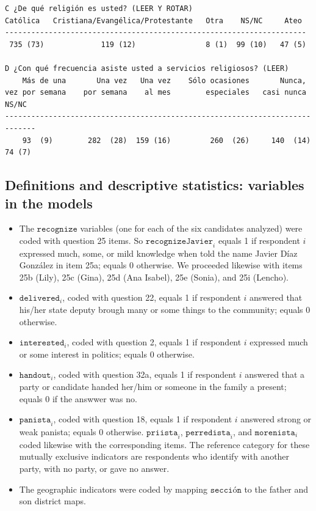 \documentclass[letter,12pt]{article}
\begin{document}
\begin{scriptsize}
\begin{verbatim}
C ¿De qué religión es usted? (LEER Y ROTAR)
Católica   Cristiana/Evangélica/Protestante   Otra    NS/NC     Ateo
---------------------------------------------------------------------
 735 (73)             119 (12)                8 (1)  99 (10)   47 (5) 

D ¿Con qué frecuencia asiste usted a servicios religiosos? (LEER)
    Más de una       Una vez   Una vez    Sólo ocasiones       Nunca,
vez por semana    por semana    al mes        especiales   casi nunca   NS/NC
-----------------------------------------------------------------------------
    93  (9)        282  (28)  159 (16)         260  (26)     140  (14) 74 (7) 
\end{verbatim}
\end{scriptsize}

\subsection{Definitions and descriptive statistics: variables in the models}

\begin{itemize}
\item The $\texttt{recognize}$ variables (one for each of the six candidates analyzed) were coded with question 25 items. So $\texttt{recognizeJavier}_i$ equals 1 if respondent $i$ expressed much, some, or mild knowledge when told the name Javier Díaz González in item 25a; equals 0 otherwise. We proceeded likewise with items 25b (Lily), 25c (Gina), 25d (Ana Isabel), 25e (Sonia), and 25i (Lencho). 
\item $\texttt{delivered}_i$, coded with question 22, equals 1 if respondent $i$ answered that his/her state deputy brough many or some things to the community; equals 0 otherwise. 
\item $\texttt{interested}_i$, coded with question 2, equals 1 if respondent $i$ expressed much or some interest in politics; equals 0 otherwise.
\item $\texttt{handout}_i$, coded with question 32a, equals 1 if respondent $i$ answered that a party or candidate handed her/him or someone in the family a present; equals 0 if the answwer was no.
\item $\texttt{panista}_i$, coded with question 18, equals 1 if respondent $i$ answered strong or weak panista; equals 0 otherwise. $\texttt{priista}_i$, $\texttt{perredista}_i$, and $\texttt{morenista}_i$ coded likewise with the corresponding items. The reference category for these mutually exclusive indicators are respondents who identify with another party, with no party, or gave no answer.
\item The geographic indicators were coded by mapping $\texttt{sección}$ to the father and son district maps.
\end{itemize}
\end{document}
